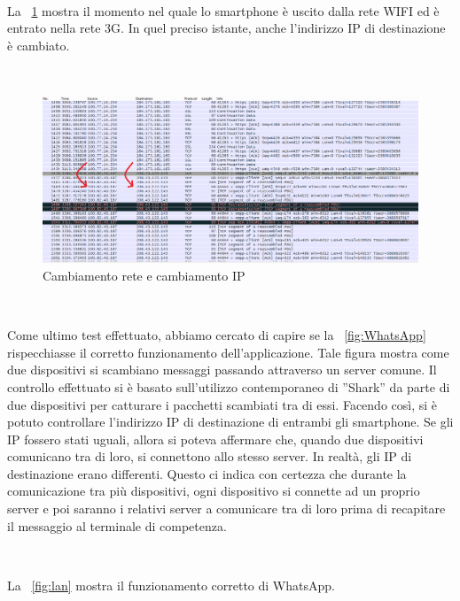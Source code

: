 \documentclass[a4paper,11pt]{book}
\begin{document}
~

La \figurename ~\ref{fig:ip-changed} mostra il momento nel quale lo smartphone \`e uscito dalla rete WIFI ed \`e entrato nella rete 3G. In quel preciso istante, anche l'indirizzo IP di destinazione  \`e cambiato.

~

\begin{figure}[!ht]
\centering
\includegraphics[scale = 0.5]{ip-changed}
\caption{Cambiamento rete e cambiamento IP}
\label{fig:ip-changed}
\end{figure}

~


\clearpage 

Come ultimo test effettuato, abbiamo cercato di capire se la \figurename ~\ref{fig:WhatsApp} rispecchiasse il corretto funzionamento dell'applicazione.
Tale figura mostra come due dispositivi si scambiano messaggi passando attraverso un server comune. 
Il controllo effettuato si \`e basato sull'utilizzo contemporaneo di ''Shark'' da parte di due dispositivi per catturare i pacchetti scambiati tra di essi. 
Facendo cos\`i, si \`e potuto controllare l'indirizzo IP di destinazione di entrambi gli smartphone. Se gli IP fossero stati uguali, allora si poteva affermare che, quando due dispositivi comunicano tra di loro, si connettono allo stesso server.
In realt\`a, gli IP di destinazione erano differenti. Questo ci indica con certezza che durante la comunicazione tra pi\`u dispositivi, ogni dispositivo si connette ad un proprio server e poi saranno i relativi server a comunicare tra di loro prima di recapitare il messaggio al terminale di competenza.

~

La \figurename ~\ref{fig:lan} mostra il funzionamento corretto di WhatsApp.  

~
\end{document}

